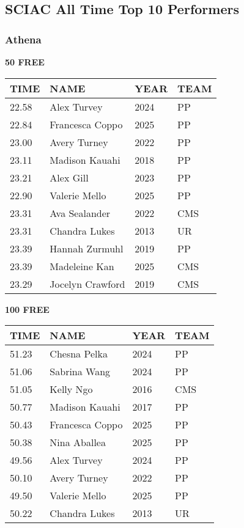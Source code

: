 \vspace{0.4cm}

\newpage

\subsection{SCIAC All Time Top 10 Performers}
\subsubsection{Athena}

\begin{minipage}[t]{0.48\textwidth}
\centering
\textbf{50 FREE}\\[0.05cm]
\begin{tabular}{@{}p{1.8cm}p{2.8cm}p{1.2cm}p{1.4cm}@{}}
\hline
\textbf{TIME} & \textbf{NAME} & \textbf{YEAR} & \textbf{TEAM} \\
\hline
22.58 & Alex Turvey & 2024 & PP \\
22.84 & Francesca Coppo & 2025 & PP \\
23.00 & Avery Turney & 2022 & PP \\
23.11 & Madison Kauahi & 2018 & PP \\
23.21 & Alex Gill & 2023 & PP \\
22.90 & Valerie Mello & 2025 & PP \\
23.31 & Ava Sealander & 2022 & CMS \\
23.31 & Chandra Lukes & 2013 & UR \\
23.39 & Hannah Zurmuhl & 2019 & PP \\
23.39 & Madeleine Kan & 2025 & CMS \\
23.29 & Jocelyn Crawford & 2019 & CMS \\
\hline
\end{tabular}
\end{minipage}\hfill
\begin{minipage}[t]{0.48\textwidth}
\centering
\textbf{100 FREE}\\[0.05cm]
\begin{tabular}{@{}p{1.8cm}p{2.8cm}p{1.2cm}p{1.4cm}@{}}
\hline
\textbf{TIME} & \textbf{NAME} & \textbf{YEAR} & \textbf{TEAM} \\
\hline
51.23 & Chesna Pelka & 2024 & PP \\
51.06 & Sabrina Wang & 2024 & PP \\
51.05 & Kelly Ngo & 2016 & CMS \\
50.77 & Madison Kauahi & 2017 & PP \\
50.43 & Francesca Coppo & 2025 & PP \\
50.38 & Nina Aballea & 2025 & PP \\
49.56 & Alex Turvey & 2024 & PP \\
50.10 & Avery Turney & 2022 & PP \\
49.50 & Valerie Mello & 2025 & PP \\
50.22 & Chandra Lukes & 2013 & UR \\
\hline
\end{tabular}
\end{minipage}

